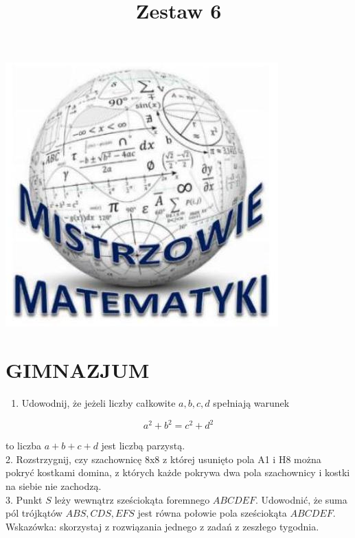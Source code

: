 \documentclass[10pt]{article}
\title{Zestaw 6 }
\author{}
\date{}
\begin{document}
\maketitle
\begin{center}
\includegraphics[max width=\textwidth]{2024_11_21_a77bc9ded3986e4e189fg-1}
\end{center}

\section*{GIMNAZJUM}
\begin{enumerate}
  \item Udowodnij, że jeżeli liczby całkowite \(a, b, c, d\) spełniają warunek
\end{enumerate}

\[
a^{2}+b^{2}=c^{2}+d^{2}
\]

to liczba \(a+b+c+d\) jest liczbą parzystą.\\
2. Rozstrzygnij, czy szachownicę 8x8 z której usunięto pola A1 i H8 można pokryć kostkami domina, z których każde pokrywa dwa pola szachownicy i kostki na siebie nie zachodzą.\\
3. Punkt \(S\) leży wewnątrz sześciokąta foremnego \(A B C D E F\). Udowodnić, że suma pól trójkątów \(A B S, C D S, E F S\) jest równa połowie pola sześciokąta \(A B C D E F\). Wskazówka: skorzystaj z rozwiązania jednego z zadań z zeszłego tygodnia.
\end{document}
